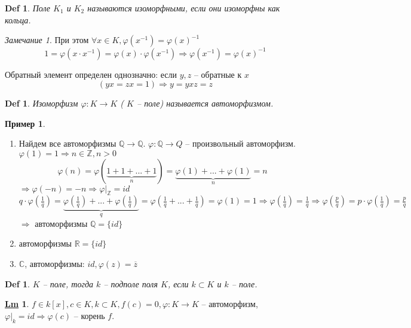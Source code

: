 \documentclass[12pt]{article}
\newenvironment{MyList}[1][4pt]{
  \begin{enumerate}[1.]
  \setlength{\parskip}{0pt}
  \setlength{\itemsep}{#1}
}{       
  \end{enumerate}
}
\def\C{\mathbb{C}}       %
\def\Q{\mathbb{Q}}       %
\def\R{\mathbb{R}}       %
\def\Z{\mathbb{Z}}       %
\def\PHI{\varphi}        %
\def\SO{\Rightarrow}     %
\theoremstyle{definition} %
\newtheorem{Lm}[Thm]{\underline{Lm}} %
\newtheorem{Example}[Thm]{Пример} %
\theoremstyle{plain} %
\newtheorem{Def}[Thm]{Def} %
\theoremstyle{remark} %
\newtheorem{Rem}[Thm]{Замечание} %
\begin{document}
{\begin{Def}
    Поле $K_1$ и $K_2$ называются изоморфными, если они изоморфны как кольца.
\end{Def}

\begin{Rem}
    При этом $\forall x \in K, \PHI(x^{-1}) = \PHI(x)^{-1}$
    $$1 = \PHI(x \cdot x^{-1}) = \PHI(x) \cdot \PHI(x^{-1}) \SO \PHI(x^{-1}) = \PHI(x)^{-1}$$

    Обратный элемент определен однозначно: если $y, z$ -- обратные к $x$ 
    \[(yx = zx = 1) \SO y = yxz = z\]
\end{Rem}

\begin{Def}
    Изоморфизм $\PHI: K \to K$ ( $K$ -- поле) называется автоморфизмом.
\end{Def}

\begin{Example}
    \begin{MyList}
        \item Найдем все автоморфизмы $\Q \to \Q$. $\PHI: \Q \to Q$ -- произвольный автоморфизм. $\PHI(1) = 1 \SO n \in \Z, n > 0$
        \[\PHI(n) = \PHI(\underbrace{1 + 1 + ... + 1}_n) = \underbrace{\PHI(1) + ... + \PHI(1)}_n = n\]
        $\SO \PHI(-n) = -n \SO\PHI|_\Z = id$ \\
        $q \cdot \PHI \left(\frac{1}{q}\right) = \underbrace{\PHI \left(\frac{1}{q}\right) + ... + \PHI \left(\frac{1}{q}\right)}_q = \PHI\left(\frac{1}{q} + ... + \frac{1}{q}\right) = \PHI(1) = 1 \SO \PHI\left(\frac{1}{q}\right) = \frac{1}{q} \SO \PHI \left(\frac{p}{q}\right) = p \cdot \PHI \left(\frac{1}{q}\right) = \frac{p}{q} $
        $\SO$ автоморфизмы $\Q = \{id\}$    

        \item автоморфизмы $\R = \{id\}$
        \item $\C$, автоморфизмы: $id, \PHI(z) = \overline{z}$   
    \end{MyList}
\end{Example}

\begin{Def}
    $K$ -- поле, тогда $k$ -- подполе поля $K$, если $k \subset K$ и $k$ -- поле.
\end{Def}

\begin{Lm}
    $f \in k[x], c \in K, k \subset K, f(c) = 0, \PHI : K \to K$ -- автоморфизм, $\PHI |_k = id \SO \PHI(c) $ -- корень $f$.
\end{Lm}

}
\end{document}
